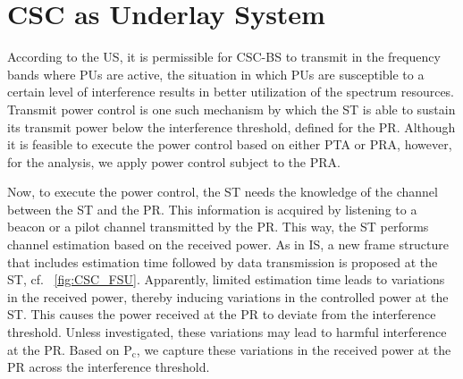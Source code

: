 \documentclass[draftcls, onecolumn, 11pt]{IEEEtran}
\newcommand{\sub}[1]{_{\text{#1}}}
\newcommand{\pc}{\text{P}\sub{c}}
\begin{document}

\section{CSC as Underlay System} \label{sec:para_u}
According to the US, it is permissible for CSC-BS to transmit in the frequency bands where PUs are active, the situation in which PUs are susceptible to a certain level of interference results in better utilization of the spectrum resources. Transmit power control is one such mechanism by which the ST is able to sustain its transmit power below the interference threshold, defined for the PR. Although it is feasible to execute the power control based on either PTA or PRA, however, for the analysis, we apply power control subject to the PRA. 

Now, to execute the power control, the ST needs the knowledge of the channel between the ST and the PR. This information is acquired by listening to a beacon or a pilot channel transmitted by the PR. This way, the ST performs channel estimation based on the received power. As in IS, a new frame structure that includes estimation time followed by data transmission is proposed at the ST, cf. \figurename~\ref{fig:CSC_FSU}. Apparently, limited estimation time leads to variations in the received power, thereby inducing variations in the controlled power at the ST. This causes the power received at the PR to deviate from the interference threshold. Unless investigated, these variations may lead to harmful interference at the PR. Based on $\pc$, we capture these variations in the received power at the PR across the interference threshold. 
\end{document}

